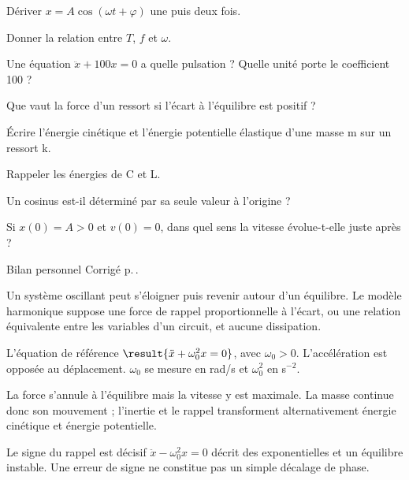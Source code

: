 \begin{questions}
\item Dériver $x=A\cos(\omega t+\varphi)$ une puis deux fois.
\item Donner la relation entre $T$, $f$ et $\omega$.
\item Une équation $\ddot x+100x=0$ a quelle pulsation ? Quelle unité porte le coefficient 100 ?
\item Que vaut la force d’un ressort si l’écart à l’équilibre est positif ?
\item Écrire l’énergie cinétique et l’énergie potentielle élastique d’une masse m sur un ressort k.
\item Rappeler les énergies de C et L.
\item Un cosinus est-il déterminé par sa seule valeur à l’origine ?
\item Si $x(0)=A>0$ et $v(0)=0$, dans quel sens la vitesse évolue-t-elle juste après ?
\end{questions}
\begin{docu}{Bilan personnel}
Corrigé p.\,\pageref{corr-diag}.
\end{docu}


Un système oscillant peut s’éloigner puis revenir autour d’un équilibre. Le modèle harmonique suppose une force de rappel proportionnelle à l’écart, ou une relation équivalente entre les variables d’un circuit, et aucune dissipation.
\begin{loi}{L’équation de référence}
$\result{\ddot x+\omega_0^2x=0}$, avec $\omega_0>0$. L’accélération est opposée au déplacement. $\omega_0$ se mesure en rad/s et $\omega_0^2$ en s$^{-2}$.
\end{loi}
La force s’annule à l’équilibre mais la vitesse y est maximale. La masse continue donc son mouvement ; l’inertie et le rappel transforment alternativement énergie cinétique et énergie potentielle.
\begin{piege}{Le signe du rappel est décisif}
$\ddot x-\omega_0^2x=0$ décrit des exponentielles et un équilibre instable. Une erreur de signe ne constitue pas un simple décalage de phase.
\end{piege}


